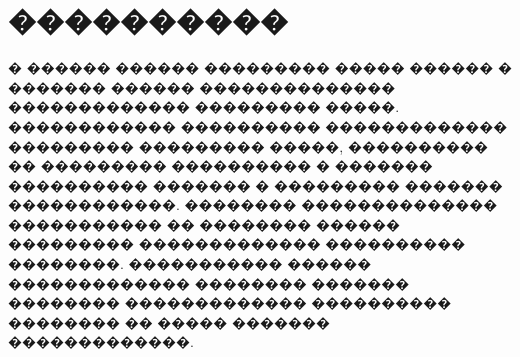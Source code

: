 \documentclass[12pt,twoside, notitlepage]{article}
\begin{document}
\section{����������}
� ������ ������ ��������� ����� ������ � ������� ������ �������������� ������������� ��������� �����.
������������ ���������� ������������� ��������� ��������� �����, ���������� �� ��������� ����������
� ������� ���������� ������� � ��������� ������� ������������.
�������� �������������� ����������� �� �������� ������ ��������� ������������� ���������� ��������.
����������� ������ ������������� �������� ������� �������� ������������� ���������� �������� �� �����
������� �������������.
\newpage
%
\end{document}
